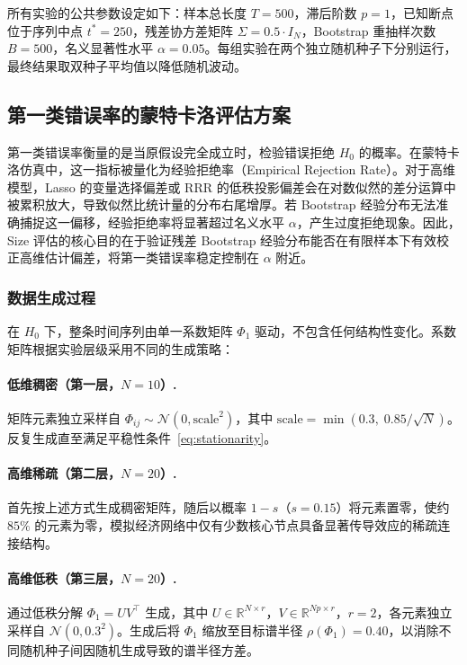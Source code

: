 所有实验的公共参数设定如下：样本总长度 $T = 500$，滞后阶数 $p = 1$，已知断点位于序列中点 $t^* = 250$，残差协方差矩阵 $\Sigma = 0.5 \cdot I_N$，Bootstrap 重抽样次数 $B = 500$，名义显著性水平 $\alpha = 0.05$。每组实验在两个独立随机种子下分别运行，最终结果取双种子平均值以降低随机波动。

\subsection{第一类错误率的蒙特卡洛评估方案}\label{subsec:type1}

第一类错误率衡量的是当原假设完全成立时，检验错误拒绝 $H_0$ 的概率。在蒙特卡洛仿真中，这一指标被量化为经验拒绝率（Empirical Rejection Rate）。对于高维模型，Lasso 的变量选择偏差或 RRR 的低秩投影偏差会在对数似然的差分运算中被累积放大，导致似然比统计量的分布右尾增厚。若 Bootstrap 经验分布无法准确捕捉这一偏移，经验拒绝率将显著超过名义水平 $\alpha$，产生过度拒绝现象。因此，Size 评估的核心目的在于验证残差 Bootstrap 经验分布能否在有限样本下有效校正高维估计偏差，将第一类错误率稳定控制在 $\alpha$ 附近。

\subsubsection{数据生成过程}

在 $H_0$ 下，整条时间序列由单一系数矩阵 $\Phi_1$ 驱动，不包含任何结构性变化。系数矩阵根据实验层级采用不同的生成策略：

\paragraph{低维稠密（第一层，$N=10$）.}
矩阵元素独立采样自 $\Phi_{ij} \sim \mathcal{N}(0, \mathrm{scale}^2)$，其中 $\mathrm{scale} = \min(0.3, \; 0.85/\sqrt{N})$。反复生成直至满足平稳性条件~\eqref{eq:stationarity}。

\paragraph{高维稀疏（第二层，$N=20$）.}
首先按上述方式生成稠密矩阵，随后以概率 $1 - s$（$s = 0.15$）将元素置零，使约 $85\%$ 的元素为零，模拟经济网络中仅有少数核心节点具备显著传导效应的稀疏连接结构。

\paragraph{高维低秩（第三层，$N=20$）.}
通过低秩分解 $\Phi_1 = UV^\top$ 生成，其中 $U \in \mathbb{R}^{N \times r}$，$V \in \mathbb{R}^{Np \times r}$，$r = 2$，各元素独立采样自 $\mathcal{N}(0, 0.3^2)$。生成后将 $\Phi_1$ 缩放至目标谱半径 $\rho(\Phi_1) = 0.40$，以消除不同随机种子间因随机生成导致的谱半径方差。

